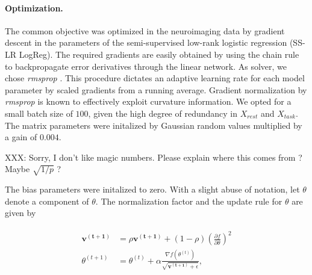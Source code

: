 \documentclass{article} %
\begin{document}
\paragraph{Optimization.}
The common objective was optimized
in the neuroimaging data
by gradient descent in the parameters
of the 
semi-supervised low-rank logistic regression (SS-LR LogReg).
The required gradients are easily obtained by using the chain rule to
backpropagate error derivatives through the linear network.
As solver, we chose \textit{rmsprop} \cite{rmsprop}.
This procedure dictates an adaptive learning rate
for each model parameter by
scaled gradients from a running average.
Gradient normalization by \textit{rmsprop}
is known to effectively exploit curvature information.
We opted for a small batch size of $100$, given the high degree of
redundancy in $X_{rest}$ and $X_{task}$.
The matrix parameters were initalized by Gaussian random values multiplied
by a gain of $0.004$. 
%

XXX: Sorry, I don't like magic numbers. Please explain where this comes from
 ? Maybe $\sqrt{1 / p}$ ?

%
The bias parameters were initalized to zero.
With a slight abuse of notation, let $\theta$ denote a component of $\theta$.
The normalization factor and the update rule for $\theta$
are given by
%

\begin{eqnarray}
  \begin{split}
    \mathbf{v^{(t+1)}} &= \rho \mathbf{v^{(t+1)}} + (1 - \rho)\left(\frac{\partial f}{\partial \theta}\right)^2
\\
\theta^{(t+1)} &= \theta^{(t)} + \alpha \frac{\nabla f(\theta^{(t)})}{\sqrt{\mathbf{v^{(t+1)}} + \epsilon}},
  \end{split}
\end{eqnarray}
\end{document}
